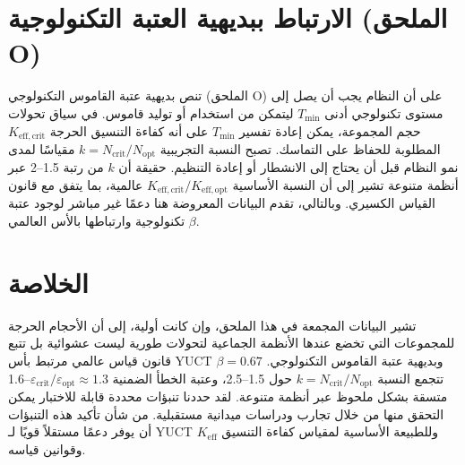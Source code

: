 \documentclass[12pt]{article}
\theoremstyle{remark}
\newcommand{\Keff}{K_{\mathrm{eff}}}
\newcommand{\Tmin}{T_{\min}}
\begin{document}
	\section{الارتباط ببديهية العتبة التكنولوجية (الملحق O)}
	\label{sec:connection}
	
	تنص بديهية عتبة القاموس التكنولوجي (الملحق O) على أن النظام يجب أن يصل إلى مستوى تكنولوجي أدنى \(\Tmin\) ليتمكن من استخدام أو توليد قاموس. في سياق تحولات حجم المجموعة، يمكن إعادة تفسير \(\Tmin\) على أنه كفاءة التنسيق الحرجة \(K_{\mathrm{eff},\text{crit}}\) المطلوبة للحفاظ على التماسك. تصبح النسبة التجريبية \(k = N_{\text{crit}}/N_{\text{opt}}\) مقياسًا لمدى نمو النظام قبل أن يحتاج إلى الانشطار أو إعادة التنظيم. حقيقة أن \(k\) من رتبة 1.5–2 عبر أنظمة متنوعة تشير إلى أن النسبة الأساسية \(K_{\mathrm{eff},\text{crit}}/K_{\mathrm{eff},\text{opt}}\) عالمية، بما يتفق مع قانون القياس الكسيري. وبالتالي، تقدم البيانات المعروضة هنا دعمًا غير مباشر لوجود عتبة تكنولوجية وارتباطها بالأس العالمي \(\beta\).
	
	\section{الخلاصة}
	\label{sec:conclusion}
	
	تشير البيانات المجمعة في هذا الملحق، وإن كانت أولية، إلى أن الأحجام الحرجة للمجموعات التي تخضع عندها الأنظمة الجماعية لتحولات طورية ليست عشوائية بل تتبع قانون قياس عالمي مرتبط بأس YUCT \(\beta = 0.67\) وبديهية عتبة القاموس التكنولوجي. تتجمع النسبة \(k = N_{\text{crit}}/N_{\text{opt}}\) حول 1.5–2.5، وعتبة الخطأ الضمنية \(\varepsilon_{\text{crit}}/\varepsilon_{\text{opt}} \approx 1.3\)–1.6 متسقة بشكل ملحوظ عبر أنظمة متنوعة. لقد حددنا تنبؤات محددة قابلة للاختبار يمكن التحقق منها من خلال تجارب ودراسات ميدانية مستقبلية. من شأن تأكيد هذه التنبؤات أن يوفر دعمًا مستقلاً قويًا لـ YUCT وللطبيعة الأساسية لمقياس كفاءة التنسيق \(\Keff\) وقوانين قياسه.
	
\end{document}
